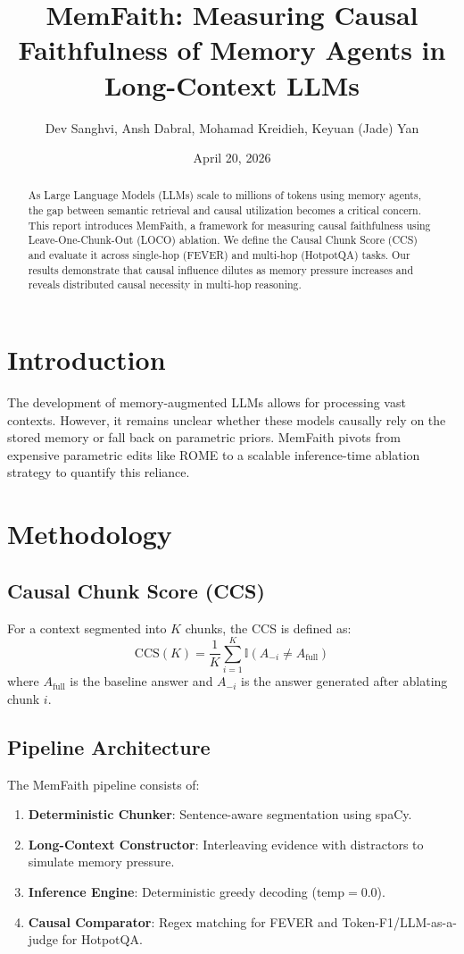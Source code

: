 \documentclass[11pt]{article}
\title{MemFaith: Measuring Causal Faithfulness of Memory Agents in Long-Context LLMs}
\author{Dev Sanghvi, Ansh Dabral, Mohamad Kreidieh, Keyuan (Jade) Yan}
\date{April 20, 2026}
\begin{document}
\maketitle

\begin{abstract}
As Large Language Models (LLMs) scale to millions of tokens using memory agents, the gap between semantic retrieval and causal utilization becomes a critical concern. This report introduces MemFaith, a framework for measuring causal faithfulness using Leave-One-Chunk-Out (LOCO) ablation. We define the Causal Chunk Score (CCS) and evaluate it across single-hop (FEVER) and multi-hop (HotpotQA) tasks. Our results demonstrate that causal influence dilutes as memory pressure increases and reveals distributed causal necessity in multi-hop reasoning.
\end{abstract}

\section{Introduction}
The development of memory-augmented LLMs allows for processing vast contexts. However, it remains unclear whether these models causally rely on the stored memory or fall back on parametric priors. MemFaith pivots from expensive parametric edits like ROME to a scalable inference-time ablation strategy to quantify this reliance.

\section{Methodology}
\subsection{Causal Chunk Score (CCS)}
For a context segmented into $K$ chunks, the CCS is defined as:
\[
\mathrm{CCS}(K) = \frac{1}{K} \sum_{i=1}^K \mathbb{I}(A_{-i} \neq A_{\text{full}})
\]
where $A_{\text{full}}$ is the baseline answer and $A_{-i}$ is the answer generated after ablating chunk $i$.

\subsection{Pipeline Architecture}
The MemFaith pipeline consists of:
\begin{enumerate}
    \item \textbf{Deterministic Chunker}: Sentence-aware segmentation using spaCy.
    \item \textbf{Long-Context Constructor}: Interleaving evidence with distractors to simulate memory pressure.
    \item \textbf{Inference Engine}: Deterministic greedy decoding ($\text{temp}=0.0$).
    \item \textbf{Causal Comparator}: Regex matching for FEVER and Token-F1/LLM-as-a-judge for HotpotQA.
\end{enumerate}
\end{document}
